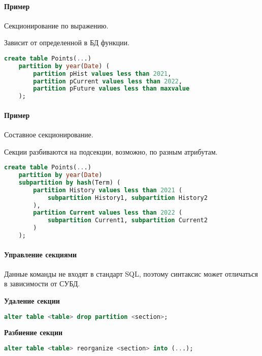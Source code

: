 \paragraph{Пример} Секционирование по выражению.

Зависит от определенной в БД функции.

\begin{lstlisting}[language=SQL]
    create table Points(...)
    partition by year(Date) (
        partition pHist values less than 2021,
        partition pCurrent values less than 2022,
        partition pFuture values less than maxvalue
    );
\end{lstlisting}

\paragraph{Пример} Составное секционирование.

Секции разбиваются на подсекции, возможно, по разным атрибутам.

\begin{lstlisting}[language=SQL]
    create table Points(...)
    partition by year(Date)
    subpartition by hash(Term) (
        partition History values less than 2021 (
            subpartition History1, subpartition History2
        ),
        partition Current values less than 2022 (
            subpartition Current1, subpartition Current2
        )
    );
\end{lstlisting}

\paragraph{Управление секциями}

\begin{remark}
	Данные команды не входят в стандарт SQL, поэтому синтаксис может отличаться в зависимости от СУБД.
\end{remark}

\textbf{Удаление секции}

\begin{lstlisting}[language=SQL]
    alter table <table> drop partition <section>;
\end{lstlisting}

\textbf{Разбиение секции}

\begin{lstlisting}[language=SQL]
    alter table <table> reorganize <section> into (...);
\end{lstlisting}

